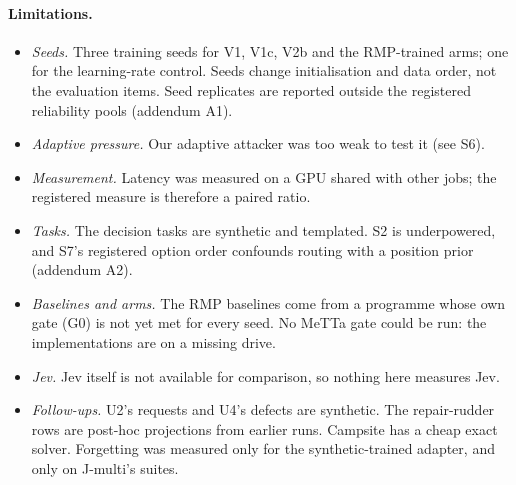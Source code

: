 \documentclass[11pt]{article}
\begin{document}
\paragraph{Limitations.}
\begin{itemize}
  \item \emph{Seeds.} Three training seeds for V1, V1c, V2b and the RMP-trained arms; one for
  the learning-rate control. Seeds change initialisation and data order, not the evaluation
  items. Seed replicates are reported outside the registered reliability pools (addendum A1).
  \item \emph{Adaptive pressure.} Our adaptive attacker was too weak to test it (see S6).
  \item \emph{Measurement.} Latency was measured on a GPU shared with other jobs; the registered
  measure is therefore a paired ratio.
  \item \emph{Tasks.} The decision tasks are synthetic and templated. S2 is underpowered, and
  S7's registered option order confounds routing with a position prior (addendum A2).
  \item \emph{Baselines and arms.} The RMP baselines come from a programme whose own gate (G0) is
  not yet met for every seed. No MeTTa gate could be run: the implementations are on a missing
  drive.
  \item \emph{Jev.} Jev itself is not available for comparison, so nothing here measures Jev.
  \item \emph{Follow-ups.} U2's requests and U4's defects are synthetic. The repair-rudder rows
  are post-hoc projections from earlier runs. Campsite has a cheap exact solver. Forgetting was
  measured only for the synthetic-trained adapter, and only on J-multi's suites.
\end{itemize}
\end{document}
